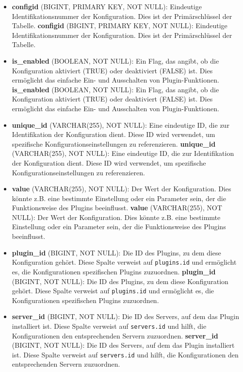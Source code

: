 \begin{itemize}
\item
  \textbf{configid} (BIGINT, PRIMARY KEY, NOT NULL): Eindeutige Identifikationsnummer der Konfiguration. Dies ist der Primärschlüssel der Tabelle.
  \textbf{configid} (BIGINT, PRIMARY KEY, NOT NULL): Eindeutige Identifikationsnummer der Konfiguration. Dies ist der Primärschlüssel der Tabelle.
\item
  \textbf{is\_enabled} (BOOLEAN, NOT NULL): Ein Flag, das angibt, ob die Konfiguration aktiviert (TRUE) oder deaktiviert (FALSE) ist. Dies ermöglicht das einfache Ein- und Ausschalten von Plugin-Funktionen.
  \textbf{is\_enabled} (BOOLEAN, NOT NULL): Ein Flag, das angibt, ob die Konfiguration aktiviert (TRUE) oder deaktiviert (FALSE) ist. Dies ermöglicht das einfache Ein- und Ausschalten von Plugin-Funktionen.
\item
  \textbf{unique\_id} (VARCHAR(255), NOT NULL): Eine eindeutige ID, die zur Identifikation der Konfiguration dient. Diese ID wird verwendet, um spezifische Konfigurationseinstellungen zu referenzieren.
  \textbf{unique\_id} (VARCHAR(255), NOT NULL): Eine eindeutige ID, die zur Identifikation der Konfiguration dient. Diese ID wird verwendet, um spezifische Konfigurationseinstellungen zu referenzieren.
\item
  \textbf{value} (VARCHAR(255), NOT NULL): Der Wert der Konfiguration. Dies könnte z.B. eine bestimmte Einstellung oder ein Parameter sein, der die Funktionsweise des Plugins beeinflusst.
  \textbf{value} (VARCHAR(255), NOT NULL): Der Wert der Konfiguration. Dies könnte z.B. eine bestimmte Einstellung oder ein Parameter sein, der die Funktionsweise des Plugins beeinflusst.
\item
  \textbf{plugin\_id} (BIGINT, NOT NULL): Die ID des Plugins, zu dem diese Konfiguration gehört. Diese Spalte verweist auf \texttt{plugins.id} und ermöglicht es, die Konfigurationen spezifischen Plugins zuzuordnen.
  \textbf{plugin\_id} (BIGINT, NOT NULL): Die ID des Plugins, zu dem diese Konfiguration gehört. Diese Spalte verweist auf \texttt{plugins.id} und ermöglicht es, die Konfigurationen spezifischen Plugins zuzuordnen.
\item
  \textbf{server\_id} (BIGINT, NOT NULL): Die ID des Servers, auf dem das Plugin installiert ist. Diese Spalte verweist auf \texttt{servers.id} und hilft, die Konfigurationen den entsprechenden Servern zuzuordnen.
  \textbf{server\_id} (BIGINT, NOT NULL): Die ID des Servers, auf dem das Plugin installiert ist. Diese Spalte verweist auf \texttt{servers.id} und hilft, die Konfigurationen den entsprechenden Servern zuzuordnen.
\end{itemize}

